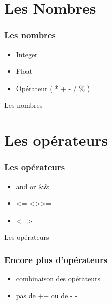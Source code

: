 \documentclass{beamer}
\begin{document}
\section{Les Nombres}

\begin{frame}
  \frametitle{Les nombres}
  \begin{itemize}
    \item Integer
    \item Float
    \item Op\'erateur ( * + - / \% )
  \end{itemize}
\end{frame}

\begin{frame}
  \begin{beamerboxesrounded}{Les nombres}
    
  \end{beamerboxesrounded}
\end{frame}

\section{Les opérateurs}

\begin{frame}
  \frametitle{Les op\'erateurs}
  \begin{itemize}
    \item and or \&\& \textbar\textbar
    \item \textless= \textless \textgreater \textgreater=
    \item \textless=\textgreater === ==
  \end{itemize}
\end{frame}

\begin{frame}
  \begin{beamerboxesrounded}{Les op\'erateurs}
    
  \end{beamerboxesrounded}
\end{frame}

\begin{frame}
  \frametitle{Encore plus d'op\'erateurs}
  \begin{itemize}
    \item combinaison des op\'erateurs
    \item pas de ++ ou de - -
  \end{itemize}
\end{frame}
\end{document}
